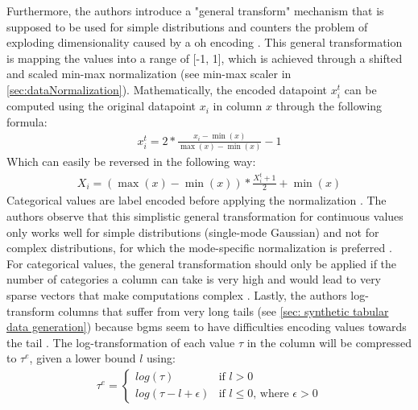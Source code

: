 Furthermore, the authors introduce a "general transform" mechanism \cite[p. 7]{zhao2022CTABGANEnhancingTabular} that is supposed to be used for simple distributions and counters the problem of exploding dimensionality caused by a \gls{oh} encoding \cite{zhao2022CTABGANEnhancingTabular}.
This general transformation is mapping the values into a range of [-1, 1], which is achieved through a shifted and scaled min-max normalization (see min-max scaler in \autoref{sec:dataNormalization}).
Mathematically, the encoded datapoint $x^t_i$ can be computed using the original datapoint $x_i$ in column $x$ through the following formula:
\begin{equation}
	\begin{align*}
		x^t_i=2* \frac{x_i-\min(x)}{\max(x)-\min(x)}-1
	\end{align*}
\end{equation}
Which can easily be reversed in the following way:
\begin{equation}
	\begin{align*}
		X_i = (\max(x)-\min(x))*\frac{X^t_i+1}{2}+\min(x)
	\end{align*}
\end{equation}
Categorical values are label encoded before applying the normalization \cite{zhao2022CTABGANEnhancingTabular}.
The authors observe that this simplistic general transformation for continuous values only works well for simple distributions (\eg single-mode Gaussian) and not for complex distributions, for which the mode-specific normalization is preferred \cite{zhao2022CTABGANEnhancingTabular}.
For categorical values, the general transformation should only be applied if the number of categories a column can take is very high and would lead to very sparse vectors that make computations complex \cite{zhao2022CTABGANEnhancingTabular}.
Lastly, the authors log-transform columns that suffer from very long tails (see \autoref{sec: synthetic tabular data generation}) because \Glspl{bgm} seem to have difficulties encoding values towards the tail \cite{zhao2022CTABGANEnhancingTabular}.
The log-transformation of each value $\tau$ in the column will be compressed to $\tau^e$, given a lower bound $l$ using:
\begin{equation}
	\label{eqn:log-transform}
	\begin{align*}
		\tau^e =
		\begin{cases}
			log(\tau)            & \text{if } l>0                                 \\
			log(\tau-l+\epsilon) & \text{if } l\leq0 \text{, where } \epsilon > 0
		\end{cases}
	\end{align*}
\end{equation}

